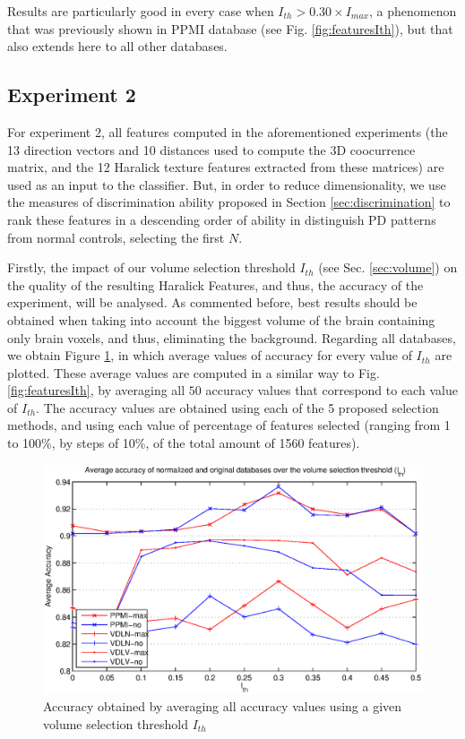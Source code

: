 Results are particularly good in every case when $I_{th} > 0.30\times I_{max}$, a phenomenon that was previously shown in PPMI database (see Fig. \ref{fig:featuresIth}), but that also extends here to all other databases. 


\subsection{Experiment 2}
For experiment 2, all features computed in the aforementioned experiments (the 13 direction vectors and 10 distances used to compute the 3D coocurrence matrix, and the 12 Haralick texture features extracted from these matrices) are used as an input to the classifier. But, in order to reduce dimensionality, we use the measures of discrimination ability proposed in Section \ref{sec:discrimination} to rank these features in a descending order of ability in distinguish PD patterns from normal controls, selecting the first $N$. 

Firstly, the impact of our volume selection threshold $I_{th}$ (see Sec. \ref{sec:volume}) on the quality of the resulting Haralick Features, and thus, the accuracy of the experiment, will be analysed. As commented before, best results should be obtained when taking into account the biggest volume of the brain containing only brain voxels, and thus, eliminating the background. Regarding all databases, we obtain Figure \ref{fig:averageAcc_IthNorm}, in which average values of accuracy for every value of $I_{th}$ are plotted. These average values are computed in a similar way to Fig. \ref{fig:featuresIth}, by averaging all $50$ accuracy values that correspond to each value of $I_{th}$. The accuracy values are obtained using each of the 5 proposed selection methods, and using each value of percentage of features selected (ranging from 1 to 100\%, by steps of 10\%, of the total amount of 1560 features). 

\begin{figure}[htp]
	\centering
	\includegraphics[width=0.90\columnwidth]{Graphics/ch5/accuracyOverIth.eps}
	\caption{Accuracy obtained by averaging all accuracy values using a given volume selection threshold $I_{th}$}
	\label{fig:averageAcc_IthNorm}
\end{figure}

